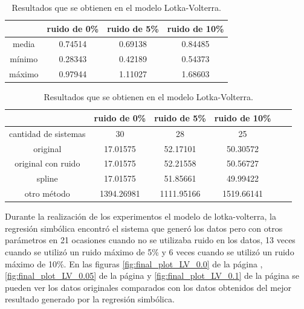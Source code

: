 \begin{table}[!h]
    \centering
    \caption{Resultados que se obtienen en el modelo Lotka-Volterra.}

    \begin{tabular}{|c|c|c|c|}
        \hline
               & \textbf{ruido de 0\%} & \textbf{ruido de 5\%} & \textbf{ruido de 10\%} \\
        \hline
        media  & 0.74514               & 0.69138               & 0.84485                \\
        \hline
        mínimo & 0.28343               & 0.42189               & 0.54373                \\
        \hline
        máximo & 0.97944               & 1.11027               & 1.68603                \\
        \hline
    \end{tabular}

    \begin{tabular}{|c|c|c|c|c|c|}
        \hline
                             & \textbf{ruido de 0\%} & \textbf{ruido de 5\%} & \textbf{ruido de 10\%} \\
        \hline
        cantidad de sistemas & 30                    & 28                    & 25                     \\
        \hline
        original             & 17.01575              & 52.17101              & 50.30572               \\
        \hline
        original con ruido   & 17.01575              & 52.21558              & 50.56727               \\
        \hline
        spline               & 17.01575              & 51.85661              & 49.99422               \\
        \hline
        otro método          & 1394.26981            & 1111.95166            & 1519.66141             \\
        \hline
    \end{tabular}

    \label{table:experiment_lotka_volterra}
\end{table}

Durante la realización de los experimentos el modelo de lotka-volterra, la regresión simbólica encontró el sistema que generó los datos pero con otros parámetros en 21 ocasiones cuando no se utilizaba ruido en los datos, 13 veces cuando se utilizó un ruido máximo de 5\% y 6 veces cuando se utilizó un ruido máximo de 10\%. En las figuras \ref{fig:final_plot_LV_0.0} de la página \pageref{fig:final_plot_LV_0.0}, \ref{fig:final_plot_LV_0.05} de la página \pageref{fig:final_plot_LV_0.05} y \ref{fig:final_plot_LV_0.1} de la página \pageref{fig:final_plot_LV_0.1} se pueden ver los datos originales comparados con los datos obtenidos del mejor resultado generado por la regresión simbólica.

